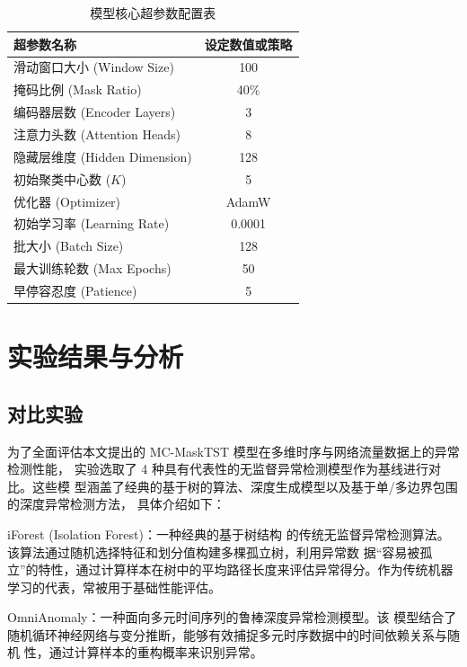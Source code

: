 \begin{table}[htbp]
    \centering
    \caption{模型核心超参数配置表}
    \label{tab:4-hyperparams}
    \begin{tabular}{lc}
        \toprule
        超参数名称 & 设定数值或策略 \\
        \midrule
        滑动窗口大小 (Window Size) & 100 \\
        掩码比例 (Mask Ratio) & 40\% \\
        编码器层数 (Encoder Layers) & 3 \\
        注意力头数 (Attention Heads) & 8 \\
        隐藏层维度 (Hidden Dimension) & 128 \\
        初始聚类中心数 ($K$) & 5 \\
        优化器 (Optimizer) & AdamW \\
        初始学习率 (Learning Rate) & 0.0001 \\
        批大小 (Batch Size) & 128 \\
        最大训练轮数 (Max Epochs) & 50 \\
        早停容忍度 (Patience) & 5 \\
        \bottomrule
    \end{tabular}
\end{table}


\section{实验结果与分析}

\subsection{对比实验}
\label{sec:4-results}
为了全面评估本文提出的 MC-MaskTST 模型在多维时序与网络流量数据上的异常检测性能，
实验选取了 4 种具有代表性的无监督异常检测模型作为基线进行对比。这些模
型涵盖了经典的基于树的算法、深度生成模型以及基于单/多边界包围的深度异常检测方法，
具体介绍如下：


iForest (Isolation Forest)\cite{liu2008isolation}：一种经典的基于树结构
的传统无监督异常检测算法。该算法通过随机选择特征和划分值构建多棵孤立树，利用异常数
据“容易被孤立”的特性，通过计算样本在树中的平均路径长度来评估异常得分。作为传统机器
学习的代表，常被用于基础性能评估。

OmniAnomaly\cite{SHI2023110725}：一种面向多元时间序列的鲁棒深度异常检测模型。该
模型结合了随机循环神经网络与变分推断，能够有效捕捉多元时序数据中的时间依赖关系与随机
性，通过计算样本的重构概率来识别异常。


